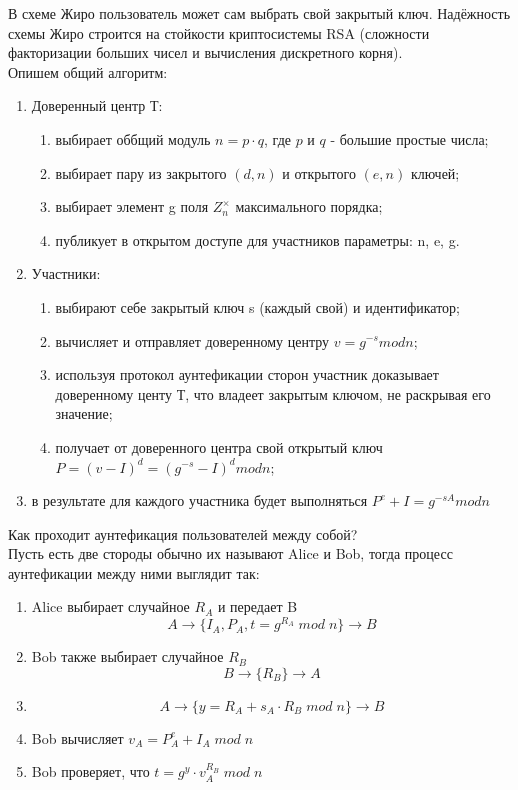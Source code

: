\documentclass[a4paper]{article}
\begin{document}
В схеме Жиро пользователь может сам выбрать свой закрытый ключ. Надёжность схемы Жиро строится на стойкости криптосистемы 
RSA (сложности факторизации больших чисел и вычисления дискретного корня).
\\
Опишем общий алгоритм:
\begin{enumerate}
    \item Доверенный центр Т:
    \begin{enumerate}
        \item выбирает оббщий модуль $n = p \cdot q$, где $p$ и $q$ - большие простые числа;
        \item выбирает пару из закрытого $(d,n)$ и открытого $(e,n)$ ключей; 
        \item выбирает элемент g поля $Z_n^\times$ максимального порядка;
        \item публикует в открытом доступе для участников параметры: n, e, g.
    \end{enumerate}
    \item Участники:
    \begin{enumerate}
        \item выбирают себе закрытый ключ s (каждый свой) и идентификатор;
        \item вычисляет и отправляет доверенному центру $v = g ^{-s} mod n$;
        \item используя протокол аунтефикации сторон участник доказывает доверенному центу Т, что владеет закрытым ключом, не раскрывая его значение;
        \item получает от доверенного центра свой открытый ключ $P = (v - I)^d = (g^{-s} -I)^d mod n$;
    \end{enumerate}
    \item в результате для каждого участника будет выполняться $P^e+I = g^{-sA} mod n$
\end{enumerate}
    Как проходит аунтефикация пользователей между собой? \\
    Пусть есть две стороды обычно их называют Alice и Bob, тогда процесс аунтефикации между ними выглядит так:
    \begin{enumerate}
        \item Alice выбирает случайное $R_A$  и передает B 
        $$A \rightarrow \{I_A, P_A, t = g^{R_A} \; mod \; n\} \rightarrow B $$
        \item Bob также выбирает случайное $R_B$
        $$B \rightarrow \{R_B\} \rightarrow A $$
        \item $$A \rightarrow \{y = R_A + s_A \cdot R_B \; mod \; n\} \rightarrow B $$
        \item Bob вычисляет $v_A = P_A^e + I_A \; mod \; n $
        \item Bob проверяет, что $t = g^y\cdot v_A^{R_B} \; mod \; n$
    \end{enumerate}
\end{document}
